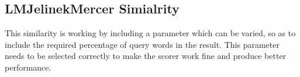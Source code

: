 \subsection{LMJelinekMercer Simialrity}

This similarity is working by including a parameter which can be varied, so as to include the required percentage of query words in the result. This parameter needs to be selected correctly to make the scorer work fine and produce better performance.
 
 \vspace{.5cm}

